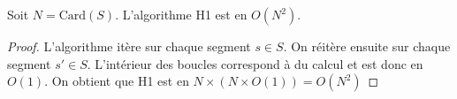 \begin{prop}
  Soit $N = \mathrm{Card}(S)$. L'algorithme H1 est en $O(N^2)$.
\end{prop}
\begin{proof}
  L'algorithme itère sur chaque segment $s \in S$.
  On réitère ensuite sur chaque segment $s' \in S$.
  L'intérieur des boucles correspond à du calcul et
  est donc en $O(1)$. On obtient que H1 est en $N\times(N\times{}O(1)) = O(N^2)$
\end{proof}




